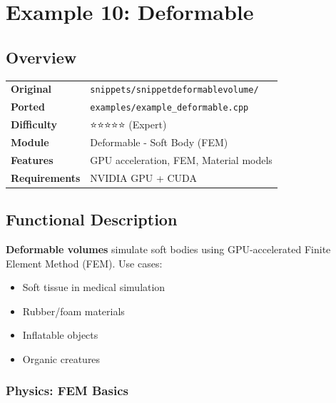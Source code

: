 
\section{Example 10: Deformable}

\subsection{Overview}

\begin{table}[h]
\centering
\begin{tabular}{|l|l|}
\hline
\textbf{Original} & \texttt{snippets/snippetdeformablevolume/} \\
\textbf{Ported} & \texttt{examples/example\_deformable.cpp} \\
\textbf{Difficulty} & ⭐⭐⭐⭐⭐ (Expert) \\
\textbf{Module} & Deformable - Soft Body (FEM) \\
\textbf{Features} & GPU acceleration, FEM, Material models \\
\textbf{Requirements} & NVIDIA GPU + CUDA \\
\hline
\end{tabular}
\end{table}

\subsection{Functional Description}

\textbf{Deformable volumes} simulate soft bodies using GPU-accelerated Finite Element Method (FEM). Use cases:

\begin{itemize}
    \item Soft tissue in medical simulation
    \item Rubber/foam materials
    \item Inflatable objects
    \item Organic creatures
\end{itemize}

\subsubsection{Physics: FEM Basics}

